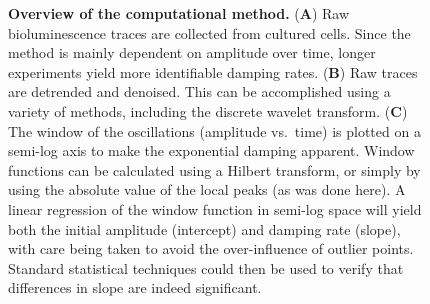 \documentclass[11pt, letterpaper]{article}
\begin{document}
\begin{figure}[tbp]
  \begin{center}
  \end{center}
  \caption{{\bfseries Overview of the computational method.} ({\bfseries A}) Raw bioluminescence traces are collected from cultured cells. Since the method is mainly dependent on amplitude over time, longer experiments yield more identifiable damping rates. ({\bfseries B}) Raw traces are detrended and denoised. This can be accomplished using a variety of methods, including the discrete wavelet transform. ({\bfseries C}) The window of the oscillations (amplitude vs.\ time) is plotted on a semi-log axis to make the exponential damping apparent. Window functions can be calculated using a Hilbert transform, or simply by using the absolute value of the local peaks (as was done here). A linear regression of the window function in semi-log space will yield both the initial amplitude (intercept) and damping rate (slope), with care being taken to avoid the over-influence of outlier points. Standard statistical techniques could then be used to verify that differences in slope are indeed significant.}
  \label{fig:comp_overview}
\end{figure}
\end{document}
